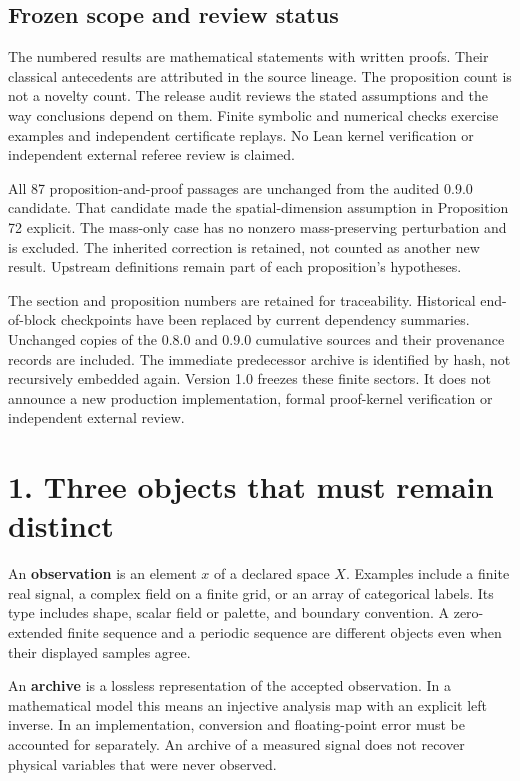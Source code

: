 \documentclass[11pt,letterpaper]{article}
\begin{document}
\subsection{Frozen scope and review
status}\label{frozen-scope-and-review-status}

The numbered results are mathematical statements with written proofs.
Their classical antecedents are attributed in the source lineage. The
proposition count is not a novelty count. The release audit reviews the
stated assumptions and the way conclusions depend on them. Finite
symbolic and numerical checks exercise examples and independent
certificate replays. No Lean kernel verification or independent external
referee review is claimed.

All 87 proposition-and-proof passages are unchanged from the audited
0.9.0 candidate. That candidate made the spatial-dimension assumption in
Proposition 72 explicit. The mass-only case has no nonzero
mass-preserving perturbation and is excluded. The inherited correction
is retained, not counted as another new result. Upstream definitions
remain part of each proposition's hypotheses.

The section and proposition numbers are retained for traceability.
Historical end-of-block checkpoints have been replaced by current
dependency summaries. Unchanged copies of the 0.8.0 and 0.9.0 cumulative
sources and their provenance records are included. The immediate
predecessor archive is identified by hash, not recursively embedded
again. Version 1.0 freezes these finite sectors. It does not announce a
new production implementation, formal proof-kernel verification or
independent external review.

\section{1. Three objects that must remain
distinct}\label{three-objects-that-must-remain-distinct}

An \textbf{observation} is an element \(x\) of a declared space \(X\).
Examples include a finite real signal, a complex field on a finite grid,
or an array of categorical labels. Its type includes shape, scalar field
or palette, and boundary convention. A zero-extended finite sequence and
a periodic sequence are different objects even when their displayed
samples agree.

An \textbf{archive} is a lossless representation of the accepted
observation. In a mathematical model this means an injective analysis
map with an explicit left inverse. In an implementation, conversion and
floating-point error must be accounted for separately. An archive of a
measured signal does not recover physical variables that were never
observed.
\end{document}
